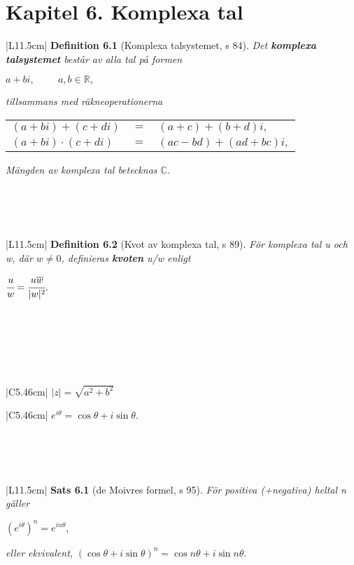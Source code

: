 \documentclass[a4paper]{article}
\begin{document}
\section*{Kapitel 6. Komplexa tal}
\begin{tabular}{|L{11.5cm}|} \hline
\textbf{Definition 6.1} (Komplexa talsystemet, s 84).
\textit{Det \textbf{komplexa talsystemet} består av alla tal på formen}
\begin{center}
$a+bi, \hspace{1cm} a,b \in \mathbb{R},$
\end{center}
\textit{tillsammans med räkneoperationerna}
\begin{tabular}{lll}
\hspace{2cm}$(a+bi)+(c+di)$ & $=$ & $(a+c)+(b+d)i,$\\
\hspace{2cm}$(a+bi)\cdot(c+di)$ & $=$&$(ac-bd)+(ad+bc)i,$
\end{tabular}

\vspace{0.2cm}
\textit{Mängden av komplexa tal betecknas $\mathbb{C}$.}
\\\hline
\end{tabular}
\\\\\\
\begin{tabular}{|L{11.5cm}|} \hline
\textbf{Definition 6.2} (Kvot av komplexa tal, s 89).
\textit{För komplexa tal u och w, där $w\neq 0$, definieras \textbf{kvoten} u/w enligt}
\begin{center}
$\cfrac{u}{w}=\cfrac{u\overline{w}}{|w|^2}.$
\end{center}
\\\hline
\end{tabular}
\\\\\\
\begin{tabular}{|C{5.46cm}|} \hline
$|z|=\sqrt{a^2+b^2}$
\\\hline
\end{tabular}
\begin{tabular}{|C{5.46cm}|} \hline
$e^{i\theta} = \cos{\theta} + i \sin{\theta}.$
\\\hline
\end{tabular}
\\\\\\
\begin{tabular}{|L{11.5cm}|} \hline
\textbf{Sats 6.1} (de Moivres formel, s 95).
\textit{För positiva (+negativa) heltal n gäller}
\begin{center}
$(e^{i\theta})^n=e^{in\theta},$
\end{center}
\textit{eller ekvivalent,}
\hspace{0.65cm}$(\cos \theta + i \sin \theta)^n=\cos n\theta + i \sin n \theta.$
\\\hline
\end{tabular}
\end{document}
